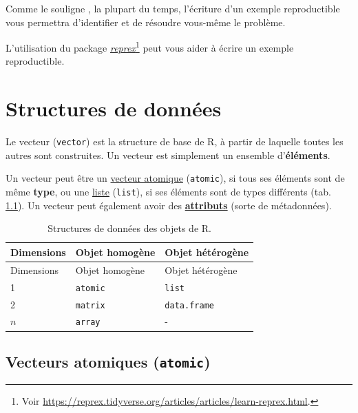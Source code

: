 \documentclass[
  french,
]{scrbook}
\begin{document}
Comme le souligne \textcite{wickham2016}, la plupart du temps, l'écriture d'un exemple reproductible vous permettra d'identifier et de résoudre vous-même le problème.

\begin{tcolorbox}[fonttitle=\sffamily\bfseries\large,title=Conseil,colframe=darkcyan]

L'utilisation du package \href{https://reprex.tidyverse.org/}{\emph{reprex}}\footnote{Voir \url{https://reprex.tidyverse.org/articles/articles/learn-reprex.html}.} peut vous aider à écrire un exemple reproductible.

\end{tcolorbox}

\hypertarget{r-vector}{%
\chapter{Structures de données}\label{r-vector}}

Le vecteur (\texttt{vector}) est la structure de base de R, à partir de laquelle toutes les autres sont construites. Un vecteur est simplement un ensemble d'\textbf{éléments}.

Un vecteur peut être un \protect\hyperlink{r-atomic}{vecteur atomique} (\texttt{atomic}), si tous ses éléments sont de même \textbf{type}, ou une \protect\hyperlink{r-list}{liste} (\texttt{list}), si ses éléments sont de types différents (tab. \ref{tab:r-data-structures}). Un vecteur peut également avoir des \protect\hyperlink{attributs}{\textbf{attributs}} (sorte de métadonnées).

\begin{longtable}[]{@{}lll@{}}
\caption{\label{tab:r-data-structures} Structures de données des objets de R.}\tabularnewline
\toprule
Dimensions & Objet homogène & Objet hétérogène \\
\midrule
\endfirsthead
\toprule
Dimensions & Objet homogène & Objet hétérogène \\
\midrule
\endhead
1 & \texttt{atomic} & \texttt{list} \\
2 & \texttt{matrix} & \texttt{data.frame} \\
\(n\) & \texttt{array} & - \\
\bottomrule
\end{longtable}

\hypertarget{r-atomic}{%
\section{\texorpdfstring{Vecteurs atomiques (\texttt{atomic})}{Vecteurs atomiques (atomic)}}\label{r-atomic}}
\end{document}
